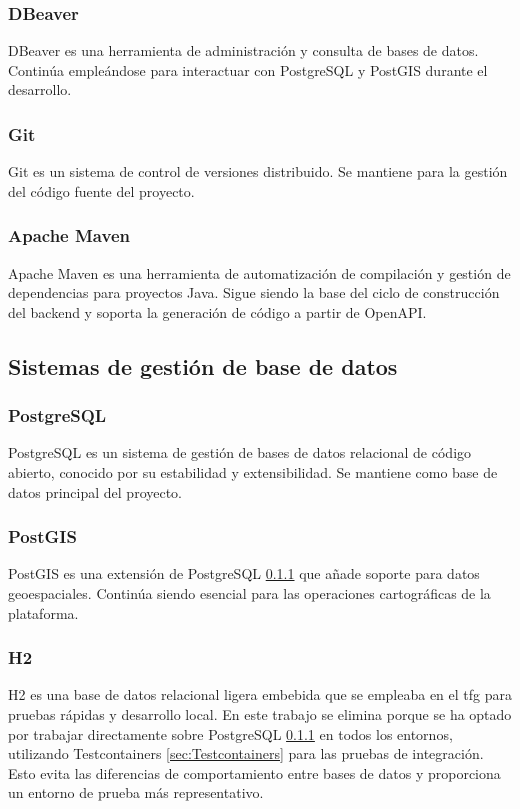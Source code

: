 \subsubsection{DBeaver}
DBeaver \cite{dbeaver} es una herramienta de administración y consulta de bases de datos. Continúa empleándose para interactuar con PostgreSQL y PostGIS durante el desarrollo.

\subsubsection{Git}
Git \cite{git} es un sistema de control de versiones distribuido. Se mantiene para la gestión del código fuente del proyecto.

\subsubsection{Apache Maven}
Apache Maven \cite{maven} es una herramienta de automatización de compilación y gestión de dependencias para proyectos Java. Sigue siendo la base del ciclo de construcción del backend y soporta la generación de código a partir de OpenAPI.

\subsection{Sistemas de gestión de base de datos}

\subsubsection{PostgreSQL}
\label{sec:postgreSQL}
PostgreSQL \cite{postgresql} es un sistema de gestión de bases de datos relacional de código abierto, conocido por su estabilidad y extensibilidad. Se mantiene como base de datos principal del proyecto.

\subsubsection{PostGIS}
\label{sec:postGIS}
PostGIS \cite{postgis} es una extensión de PostgreSQL \ref{sec:postgreSQL} que añade soporte para datos geoespaciales. Continúa siendo esencial para las operaciones cartográficas de la plataforma.

\subsubsection{H2}
H2 \cite{h2} es una base de datos relacional ligera embebida que se empleaba en el \acrshort{tfg} para pruebas rápidas y desarrollo local. En este trabajo se elimina porque se ha optado por trabajar directamente sobre PostgreSQL \ref{sec:postgreSQL} en todos los entornos, utilizando Testcontainers \ref{sec:Testcontainers} para las pruebas de integración. Esto evita las diferencias de comportamiento entre bases de datos y proporciona un entorno de prueba más representativo.


